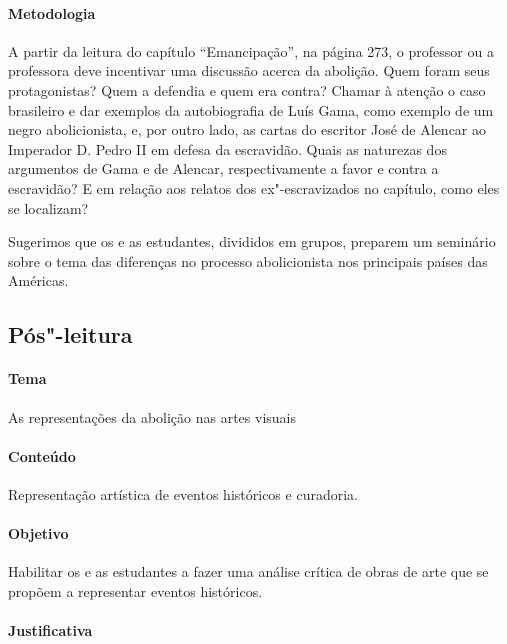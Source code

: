 \documentclass[11pt]{extarticle}
\begin{document}
\begin{enumerate}
\begin{enumerate}
\begin{enumerate}
\paragraph{Metodologia} A partir da leitura do capítulo ``Emancipação'', na página 273, o professor ou a professora
deve incentivar uma discussão acerca da abolição. Quem foram seus protagonistas? Quem a defendia
e quem era contra? 
Chamar à atenção o caso brasileiro e dar exemplos da autobiografia de Luís Gama,
como exemplo de um negro abolicionista, e, por outro lado, as cartas do escritor José de Alencar
ao Imperador D. Pedro II em defesa da escravidão. 
Quais as naturezas dos argumentos de Gama e de Alencar, respectivamente a favor e contra a escravidão?
E em relação aos relatos dos ex"-escravizados no capítulo, como eles se localizam?

Sugerimos que os e as estudantes, divididos em grupos, preparem um seminário sobre o tema
das diferenças no processo abolicionista nos principais países das Américas. 


\subsection{Pós"-leitura}

\paragraph{Tema} As representações da abolição nas artes visuais

\paragraph{Conteúdo} Representação artística de eventos históricos e curadoria.

\paragraph{Objetivo} Habilitar os e as estudantes a fazer uma análise
crítica de obras de arte que se propõem a representar eventos históricos.

\paragraph{Justificativa} 


\end{enumerate}
\end{enumerate}
\end{enumerate}
\end{document}
